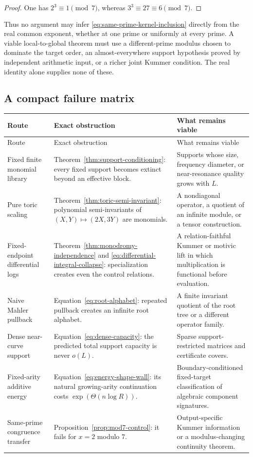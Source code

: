 \documentclass[11pt,oneside]{article}
\theoremstyle{definition}
\theoremstyle{remark}
\begin{document}
\begin{proof}
One has $2^3\equiv1\pmod7$, whereas $3^3\equiv27\equiv6\pmod7$.
\end{proof}

Thus no argument may infer \eqref{eq:same-prime-kernel-inclusion} directly from the real common
exponent, whether at one prime or uniformly at every prime.  A viable local-to-global theorem must
use a different-prime modulus chosen to dominate the target order, an almost-everywhere support
hypothesis proved by independent arithmetic input, or a richer joint Kummer condition.  The real
identity alone supplies none of these.

\subsection{A compact failure matrix}

\begin{longtable}{L{0.23\textwidth}L{0.30\textwidth}L{0.36\textwidth}}
\toprule
Route & Exact obstruction & What remains viable \\
\midrule
\endfirsthead
\toprule
Route & Exact obstruction & What remains viable \\
\midrule
\endhead
Fixed finite monomial library & Theorem~\ref{thm:support-conditioning}: every fixed support becomes extinct beyond an effective block. & Supports whose size, frequency diameter, or near-resonance quality grows with $L$. \\
Pure toric scaling & Theorem~\ref{thm:toric-semi-invariant}: polynomial semi-invariants of $(X,Y)\mapsto(2X,3Y)$ are monomials. & A nondiagonal operator, a quotient of an infinite module, or a tensor construction. \\
Fixed-endpoint differential logs & Theorem~\ref{thm:monodromy-independence} and \eqref{eq:differential-integral-collapse}: specialization creates even the control relations. & A relation-faithful Kummer or motivic lift in which multiplication is functional before evaluation. \\
Naive Mahler pullback & Equation~\eqref{eq:root-alphabet}: repeated pullback creates an infinite root alphabet. & A finite invariant quotient of the root tree or a different operator family. \\
Dense near-curve support & Equation~\eqref{eq:dense-capacity}: the predicted total support capacity is never $o(L)$. & Sparse support-restricted matrices and certificate covers. \\
Fixed-arity additive energy & Equation~\eqref{eq:energy-shape-wall}: its natural growing-arity continuation costs $\exp(\Theta(n\log R))$. & Boundary-conditioned fixed-target classification of algebraic component signatures. \\
Same-prime congruence transfer & Proposition~\ref{prop:mod7-control}: it fails for $x=2$ modulo $7$. & Output-specific Kummer information or a modulus-changing continuity theorem. \\
\bottomrule
\end{longtable}
\end{document}

